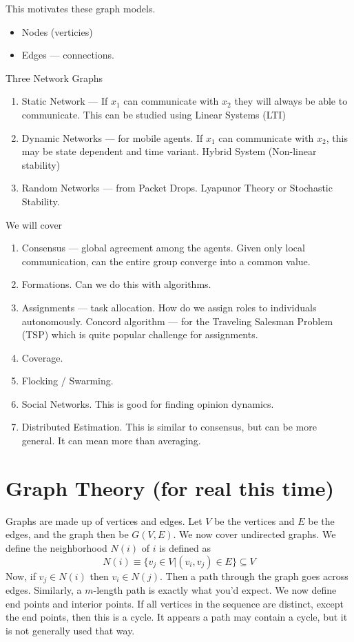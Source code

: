 \documentclass{article}
\begin{document}
This motivates these graph models. 
\begin{itemize}
\item Nodes (verticies)
\item Edges --- connections. 
\end{itemize}

Three Network Graphs
\begin{enumerate}
\item Static Network --- If $x_1$ can communicate with $x_2$ they will always be
able to communicate. This can be studied using Linear Systems (LTI)


\item Dynamic Networks --- for mobile agents. If $x_1$ can communicate with $x_2$,
this may be state dependent and time variant. Hybrid System (Non-linear
stability)

\item Random Networks --- from Packet Drops. Lyapunor Theory or Stochastic
Stability.
\end{enumerate}

We will cover
\begin{enumerate}
\item Consensus --- global agreement among the agents. Given only local
communication, can the entire group converge into a common value. 
\item Formations. Can we do this with algorithms. 
\item Assignments --- task allocation. How do we assign roles to individuals
autonomously. Concord algorithm --- for the Traveling Salesman Problem (TSP) which is quite popular challenge
for assignments. 
\item Coverage. 
\item Flocking / Swarming. 
\item Social Networks. This is good for finding opinion dynamics. 
\item Distributed Estimation. This is similar to consensus, but can be more
general. It can mean more than averaging. 
\end{enumerate}

\section{Graph Theory (for real this time)}
Graphs are made up of vertices and edges. Let $V$ be the vertices and $E$ be the
edges, and the graph then be $G(V,E)$. We now cover undirected graphs. We define
the neighborhood $N(i)$ of $i$ is defined as 
\[ N(i) \equiv \{v_j \in V | (v_i, v_j) \in E\} \subseteq V \]
Now, if $v_j \in N(i)$ then $v_i \in N(j)$. Then a path through the graph goes
across edges. Similarly, a $m$-length path is exactly what you'd expect. We now
define end points and interior points. If all vertices in the sequence are
distinct, except the end points, then this is a cycle. It appears a path may
contain a cycle, but it is not generally used that way. 
\end{document}
